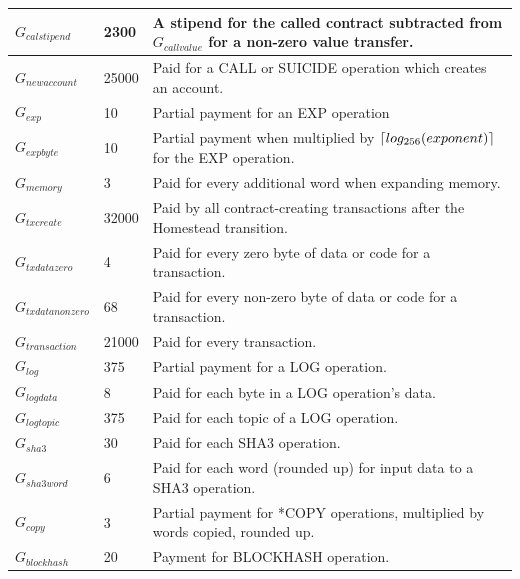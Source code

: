 \documentclass{article}
\DeclarePairedDelimiter{\ceil}{\lceil}{\rceil}
\begin{document}
\begin{tabular}{| l | l | l |}
			$G_{calstipend}$ 	& 2300		& A stipend for the called contract subtracted from $G_{callvalue}$ for a non-zero value transfer. \\ \hline
			$G_{newaccount}$ 	& 25000		& Paid for a CALL or SUICIDE operation which creates an account. \\ \hline
			$G_{exp}$ 			& 10 		& Partial payment for an EXP operation \\ \hline
			$G_{expbyte}$ 		& 10		& Partial payment when multiplied by $\ceil{log_{256}(exponent)}$  for the EXP operation. 	 \\ \hline
			$G_{memory}$ 		& 3			& Paid for every additional word when expanding memory. \\ \hline
			$G_{txcreate}$ 		& 32000		& Paid by all contract-creating transactions after the Homestead transition. \\ \hline
			$G_{txdatazero}$ 	& 4 		& Paid for every zero byte of data or code for a transaction. \\ \hline
			$G_{txdatanonzero}$ & 68		& Paid for every non-zero byte of data or code for a transaction. \\ \hline
			$G_{transaction}$ 	& 21000		& Paid for every transaction. \\ \hline
			$G_{log}$ 			& 375 		& Partial payment for a LOG operation. \\ \hline
			$G_{logdata}$ 		& 8			& Paid for each byte in a LOG operation's data. \\ \hline
			$G_{logtopic}$ 		& 375		& Paid for each topic of a LOG operation. \\ \hline
			$G_{sha3}$ 			& 30		& Paid for each SHA3 operation. \\ \hline
			$G_{sha3word}$ 		& 6			& Paid for each word (rounded up) for input data to a SHA3 operation. \\ \hline
			$G_{copy}$ 			& 3			& Partial payment for *COPY operations, multiplied by words copied, rounded up. \\ \hline
			$G_{blockhash}$ 	& 20		& Payment for BLOCKHASH operation. \\ 
			\hline
		\end{tabular}
\end{document}
